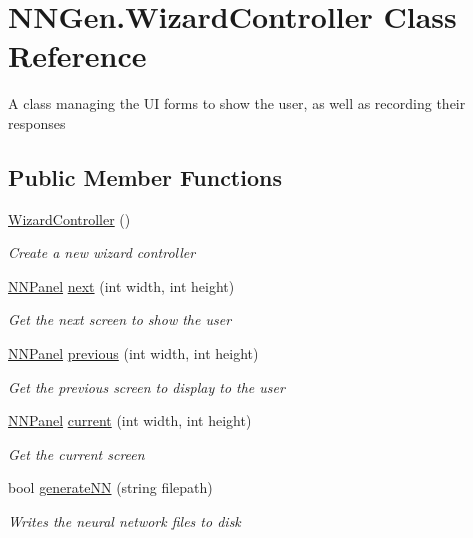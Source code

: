 \hypertarget{class_n_n_gen_1_1_wizard_controller}{}\section{N\+N\+Gen.\+Wizard\+Controller Class Reference}
\label{class_n_n_gen_1_1_wizard_controller}


A class managing the U\+I forms to show the user, as well as recording their responses  


\subsection*{Public Member Functions}
\begin{DoxyCompactItemize}
\item 
\hyperlink{class_n_n_gen_1_1_wizard_controller_ab4b572ad55d5e544cc65cbf850e4bcf8}{Wizard\+Controller} ()
\begin{DoxyCompactList}\small\item\em Create a new wizard controller \end{DoxyCompactList}\item 
\hyperlink{class_n_n_gen_1_1_n_n_panel}{N\+N\+Panel} \hyperlink{class_n_n_gen_1_1_wizard_controller_a8cb8ef289bd566a55e9cf63448fb503f}{next} (int width, int height)
\begin{DoxyCompactList}\small\item\em Get the next screen to show the user \end{DoxyCompactList}\item 
\hyperlink{class_n_n_gen_1_1_n_n_panel}{N\+N\+Panel} \hyperlink{class_n_n_gen_1_1_wizard_controller_a56f2cde3be2146a4d215bae7cc773b42}{previous} (int width, int height)
\begin{DoxyCompactList}\small\item\em Get the previous screen to display to the user \end{DoxyCompactList}\item 
\hyperlink{class_n_n_gen_1_1_n_n_panel}{N\+N\+Panel} \hyperlink{class_n_n_gen_1_1_wizard_controller_a7fad78197da21bbd70fbd874d16712cb}{current} (int width, int height)
\begin{DoxyCompactList}\small\item\em Get the current screen \end{DoxyCompactList}\item 
bool \hyperlink{class_n_n_gen_1_1_wizard_controller_abdc2fb0f10dc7fc8fd0fec5f048060f4}{generate\+N\+N} (string filepath)
\begin{DoxyCompactList}\small\item\em Writes the neural network files to disk \end{DoxyCompactList}\end{DoxyCompactItemize}
